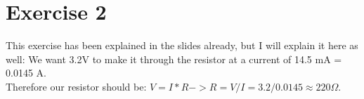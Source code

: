 \part*{Exercise 2}
This exercise has been explained in the slides already, but I will explain it here as well:
We want 3.2V to make it through the resistor at a current of 14.5 mA = 0.0145 A.\\
Therefore our resistor should be: $V = I*R -> R = V/I = 3.2/0.0145 \approx 220\Omega.$